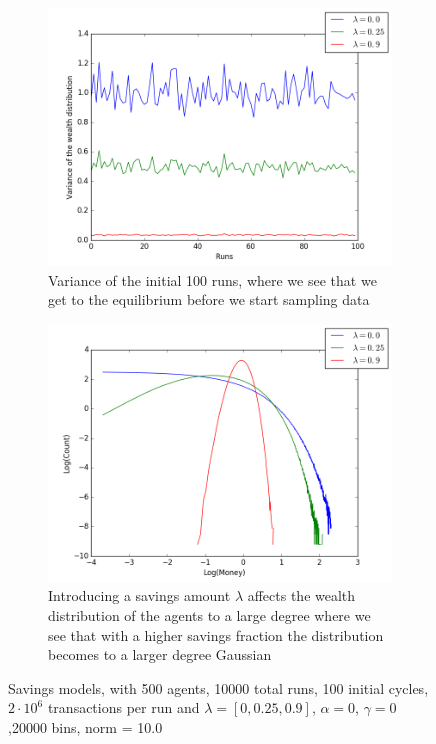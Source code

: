 \documentclass[a4paper,11pt]{article}
\begin{document}
{\begin{figure}[H]
	\centering
	\begin{subfigure}[t]{0.45\textwidth}
		\includegraphics[scale=0.4]{savinginit}
		\caption{Variance of the initial 100 runs, where we see that we get to the equilibrium before we start sampling data}
		\label{fig:savinginit}
	\end{subfigure}
	\begin{subfigure}[t]{0.45\textwidth}
		\includegraphics[scale=0.4]{Saving}
		\caption{Introducing a savings amount $\lambda$ affects the wealth distribution of the agents to a large degree where we see that with a higher savings fraction the distribution becomes to a larger degree Gaussian}
		\label{fig:Saving}
	\end{subfigure}
	\caption{Savings models, with 500 agents, 10000 total runs, 100 initial cycles,  $2\cdot 10^{6}$ transactions per run and  $\lambda=[0,0.25,0.9]$, $\alpha=0$, $\gamma=0$,20000 bins, norm = 10.0}
	\label{fig:savings}
\end{figure}

}
\end{document}
